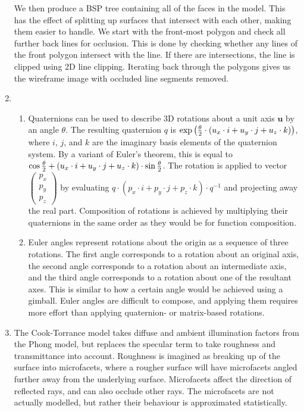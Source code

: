 \documentclass{article}
\begin{document}
\begin{enumerate}
    We then produce a BSP tree containing all of the faces in the model. This has the effect of splitting up surfaces that intersect with each other, making them easier to handle. We start with the front-most polygon and check all further back lines for occlusion. This is done by checking whether any lines of the front polygon intersect with the line. If there are intersections, the line is clipped using 2D line clipping. Iterating back through the polygons gives us the wireframe image with occluded line segments removed.
  \item
    \begin{enumerate}
    \item Quaternions can be used to describe 3D rotations about a unit axis $\mathbf u$ by an angle $\theta$. The resulting quaternion $q$ is $\exp\left({\theta \over 2} \cdot (u_x \cdot i + u_y \cdot j + u_z \cdot k)\right)$, where $i$, $j$, and $k$ are the imaginary basis elements of the quaternion system. By a variant of Euler's theorem, this is equal to $\cos{\theta \over 2} + (u_x \cdot i + u_y \cdot j + u_z \cdot k) \cdot \sin{\theta \over 2}$. The rotation is applied to vector $\begin{pmatrix}p_x\\p_y\\p_z\end{pmatrix}$ by evaluating $q \cdot (p_x \cdot i + p_y \cdot j + p_z \cdot k) \cdot q^{-1}$ and projecting away the real part. Composition of rotations is achieved by multiplying their quaternions in the same order as they would be for function composition.
      \item Euler angles represent rotations about the origin as a sequence of three rotations. The first angle corresponds to a rotation about an original axis, the second angle corresponds to a rotation about an intermediate axis, and the third angle corresponds to a rotation about one of the resultant axes. This is similar to how a certain angle would be achieved using a gimball. Euler angles are difficult to compose, and applying them requires more effort than applying quaternion- or matrix-based rotations.
    \end{enumerate}
  \item The Cook-Torrance model takes diffuse and ambient illumination factors from the Phong model, but replaces the specular term to take roughness and transmittance into account. Roughness is imagined as breaking up of the surface into microfacets, where a rougher surface will have microfacets angled further away from the underlying surface. Microfacets affect the direction of reflected rays, and can also occlude other rays. The microfacets are not actually modelled, but rather their behaviour is approximated statistically.
\end{enumerate}
\end{document}
